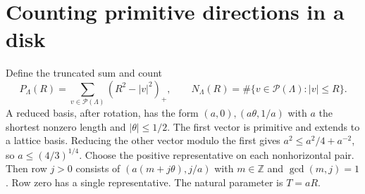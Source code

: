 \documentclass[11pt]{article}
\newcommand{\Z}{\mathbb Z}\newcommand{\R}{\mathbb R}\newcommand{\E}{\mathcal E}
\begin{document}
\section{Counting primitive directions in a disk}
Define the truncated sum and count
\[
 P_\Lambda(R)=\sum_{v\in\mathcal P(\Lambda)}(R^2-|v|^2)_+,
 \qquad N_\Lambda(R)=\#\{v\in\mathcal P(\Lambda):|v|\le R\}.
\]
A reduced basis, after rotation, has the form $(a,0),(a\theta,1/a)$ with $a$ the shortest nonzero length and $|\theta|\le1/2$. The first vector is primitive and extends to a lattice basis. Reducing the other vector modulo the first gives $a^2\le a^2/4+a^{-2}$, so $a\le(4/3)^{1/4}$. Choose the positive representative on each nonhorizontal pair. Then row $j>0$ consists of $(a(m+j\theta),j/a)$ with $m\in\Z$ and $\gcd(m,j)=1$. Row zero has a single representative. The natural parameter is $T=aR$.
\end{document}
